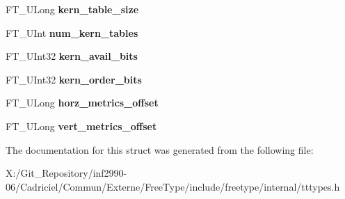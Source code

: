 \begin{DoxyCompactItemize}
\item 
\hypertarget{struct_t_t___face_rec___acfef0fabbe95af382fb0710edfe98887}{F\-T\-\_\-\-U\-Long {\bfseries kern\-\_\-table\-\_\-size}}\label{struct_t_t___face_rec___acfef0fabbe95af382fb0710edfe98887}

\item 
\hypertarget{struct_t_t___face_rec___a9c5b27564d0c22e0ee6edd7b6dc675c0}{F\-T\-\_\-\-U\-Int {\bfseries num\-\_\-kern\-\_\-tables}}\label{struct_t_t___face_rec___a9c5b27564d0c22e0ee6edd7b6dc675c0}

\item 
\hypertarget{struct_t_t___face_rec___a5f97232ee6773a57ef8734555cc960e1}{F\-T\-\_\-\-U\-Int32 {\bfseries kern\-\_\-avail\-\_\-bits}}\label{struct_t_t___face_rec___a5f97232ee6773a57ef8734555cc960e1}

\item 
\hypertarget{struct_t_t___face_rec___a810b4e002ebbdfcb44005cb69b09a917}{F\-T\-\_\-\-U\-Int32 {\bfseries kern\-\_\-order\-\_\-bits}}\label{struct_t_t___face_rec___a810b4e002ebbdfcb44005cb69b09a917}

\item 
\hypertarget{struct_t_t___face_rec___a5ff62c77d90743e333ca8dfa7d382f22}{F\-T\-\_\-\-U\-Long {\bfseries horz\-\_\-metrics\-\_\-offset}}\label{struct_t_t___face_rec___a5ff62c77d90743e333ca8dfa7d382f22}

\item 
\hypertarget{struct_t_t___face_rec___a33baf2e26d533d82f06875361fd423d1}{F\-T\-\_\-\-U\-Long {\bfseries vert\-\_\-metrics\-\_\-offset}}\label{struct_t_t___face_rec___a33baf2e26d533d82f06875361fd423d1}

\end{DoxyCompactItemize}


The documentation for this struct was generated from the following file\-:\begin{DoxyCompactItemize}
\item 
X\-:/\-Git\-\_\-\-Repository/inf2990-\/06/\-Cadriciel/\-Commun/\-Externe/\-Free\-Type/include/freetype/internal/tttypes.\-h\end{DoxyCompactItemize}
